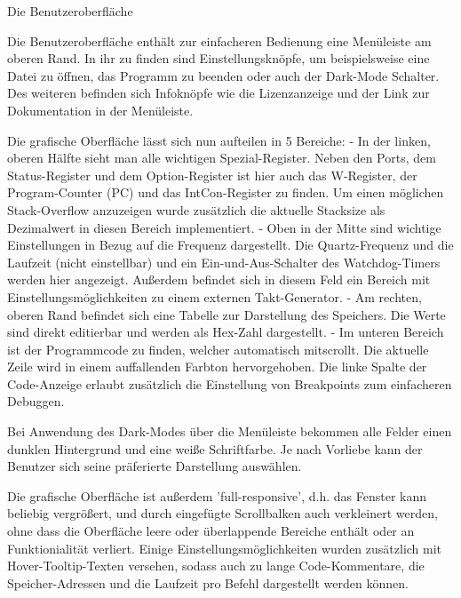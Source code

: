 Die Benutzeroberfläche

Die Benutzeroberfläche enthält zur einfacheren Bedienung eine Menüleiste am oberen Rand. In ihr zu finden sind Einstellungsknöpfe, um beispielsweise eine Datei zu öffnen, das Programm zu beenden oder auch der Dark-Mode Schalter. Des weiteren befinden sich Infoknöpfe wie die Lizenzanzeige und der Link zur Dokumentation in der Menüleiste. 

Die grafische Oberfläche lässt sich nun aufteilen in 5 Bereiche: 
- In der linken, oberen Hälfte sieht man alle wichtigen Spezial-Register. Neben den Ports, dem Status-Register und dem Option-Register ist hier auch das W-Register, der Program-Counter (PC) und das IntCon-Register zu finden. Um einen möglichen Stack-Overflow anzuzeigen wurde zusätzlich die aktuelle Stacksize als Dezimalwert in diesen Bereich implementiert. 
- Oben in der Mitte sind wichtige Einstellungen in Bezug auf die Frequenz dargestellt. Die Quartz-Frequenz und die Laufzeit (nicht einstellbar) und ein Ein-und-Aus-Schalter des Watchdog-Timers werden hier angezeigt. Außerdem befindet sich in diesem Feld ein Bereich mit Einstellungsmöglichkeiten zu einem externen Takt-Generator. 
- Am rechten, oberen Rand befindet sich eine Tabelle zur Darstellung des Speichers. Die Werte sind direkt editierbar und werden als Hex-Zahl dargestellt. 
- Im unteren Bereich ist der Programmcode zu finden, welcher automatisch mitscrollt. Die aktuelle Zeile wird in einem auffallenden Farbton hervorgehoben. Die linke Spalte der Code-Anzeige erlaubt zusätzlich die Einstellung von Breakpoints zum einfacheren Debuggen. 

Bei Anwendung des Dark-Modes über die Menüleiste bekommen alle Felder einen dunklen Hintergrund und eine weiße Schriftfarbe. Je nach Vorliebe kann der Benutzer sich seine präferierte Darstellung auswählen. 

Die grafische Oberfläche ist außerdem 'full-responsive', d.h. das Fenster kann beliebig vergrößert, und durch eingefügte Scrollbalken auch verkleinert werden, ohne dass die Oberfläche leere oder überlappende Bereiche enthält oder an Funktionialität verliert. 
Einige Einstellungsmöglichkeiten wurden zusätzlich mit Hover-Tooltip-Texten versehen, sodass auch zu lange Code-Kommentare, die Speicher-Adressen und die Laufzeit pro Befehl dargestellt werden können. 

